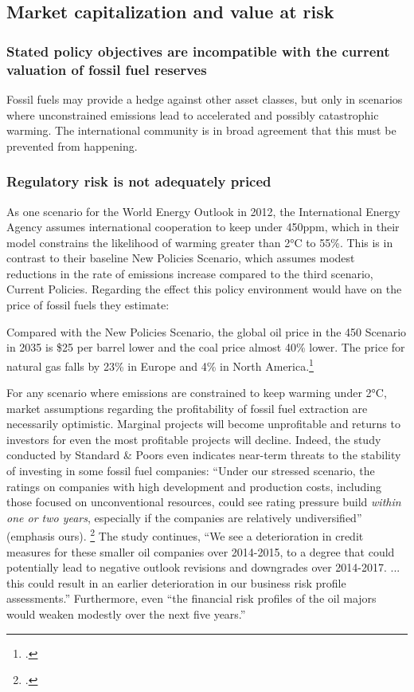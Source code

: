 \subsection {Market capitalization and value at risk}

\subsubsection {Stated policy objectives are incompatible with the current valuation of fossil fuel reserves}

Fossil fuels may provide a hedge against other asset classes, but only in scenarios where unconstrained emissions lead to accelerated and possibly catastrophic warming. 
The international community is in broad agreement that this must be prevented from happening.




\subsubsection {Regulatory risk is not adequately priced} 



As one scenario for the World Energy Outlook in 2012, the International Energy Agency assumes international cooperation to keep  under 450ppm, which in their model constrains the likelihood of warming greater than 2°C to 55\%. 
This is in contrast to their baseline New Policies Scenario, which assumes modest reductions in the rate of emissions increase compared to the third scenario, Current Policies. 
Regarding the effect this policy environment would have on the price of fossil fuels they estimate:
\begin{slquote}Compared with the New Policies Scenario, the global oil price in the 450 Scenario in 2035 is \$25 per barrel lower and the coal price almost 40\% lower. The price for natural gas falls by 23\% in Europe and 4\% in North America.\footcite[][p. 257]{IEA2012}
\end{slquote}

For any scenario where emissions are constrained to keep warming under 2°C, market assumptions regarding the profitability of fossil fuel extraction are necessarily optimistic. 
Marginal projects will become unprofitable and returns to investors for even the most profitable projects will decline. 
Indeed, the study conducted by Standard & Poors even indicates near-term threats to the stability of investing in some fossil fuel companies:
  ``Under our stressed scenario, the ratings on companies with high development and production costs, including those focused on unconventional resources, could see rating pressure build \emph{within one or two years}, especially if the companies are relatively undiversified'' (emphasis ours). \footcite{SandPConstrained}
  The study continues, ``We see a deterioration in credit measures for these smaller oil companies over 2014-2015, to a degree that could potentially lead to negative outlook revisions and downgrades over 2014-2017. ... this could result in an earlier deterioration in our business risk profile assessments.''
  Furthermore, even ``the financial risk profiles of the oil majors would weaken modestly over the next five years.''
  
